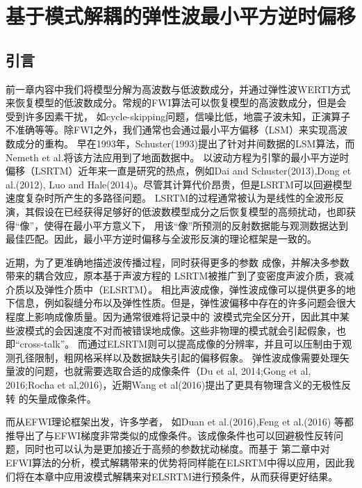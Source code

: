 \chapter{基于模式解耦的弹性波最小平方逆时偏移}
\label{cha:MD-ELSRTM}
\section{引言}
前一章内容中我们将模型分解为高波数与低波数成分，并通过弹性波WERTI方式来恢复模型的低波数成分。常规的FWI算法可以恢复模型的高波数成分，但是会受到许多因素干扰，
如cycle-skipping问题，信噪比低，地震子波未知，正演算子不准确等等。除FWI之外，我们通常也会通过最小平方偏移（LSM）来实现高波数成分的重构。
早在1993年，Schuster(1993)\cite{Schuster1993}提出了针对井间数据的LSM算法，而Nemeth et al.\cite{Nemeth1999}将该方法应用到了地面数据中。
以波动方程为引擎的最小平方逆时偏移（LSRTM）近年来一直是研究的热点，例如Dai and
Schuster(2013)\cite{Dai2013},Dong et al.(2012)\cite{Dong2012}, Luo and
Hale(2014)\cite{Luo2014}。尽管其计算代价昂贵，但是LSRTM可以回避模型速度复杂时所产生的多路径问题。
LSRTM的过程通常被认为是线性的全波形反演，其假设在已经获得足够好的低波数模型成分之后恢复模型的高频扰动，也即获得“像”，使得在最小平方意义下，
用该“像”所预测的反射数据能与观测数据达到最佳匹配。因此，最小平方逆时偏移与全波形反演的理论框架是一致的。

近期，为了更准确地描述波传播过程，同时获得更多的参数
成像，并解决多参数带来的耦合效应，原本基于声波方程的
LSRTM被推广到了变密度声波介质\cite{Yang2016}，衰减介质\cite{Dai2015}以及弹性介质中\cite{Duan2016,Feng2016,Xu2016}（ELSRTM）。
相比声波成像，弹性波成像可以提供更多的地下信息，例如裂缝分布以及弹性性质。但是，弹性波偏移中存在的许多问题会很大程度上影响成像质量。因为通常很难将记录中的
波模式完全区分开，因此其中某些波模式的会因速度不对而被错误地成像。这些非物理的模式就会引起假象，也即“cross-talk”。
而通过ELSRTM则可以提高成像的分辨率，并且可以压制由于观测孔径限制，粗网格采样以及数据缺失引起的偏移假象。
弹性波成像需要处理矢量波的问题，也就需要选取合适的成像条件（Du et al, 2014\cite{DuEtAl2014};Gong et
al, 2016\cite{GongEtAl2016};Rocha et al,2016\cite{RochaEtAl2016a})，近期Wang et
al(2016)\cite{WangEtAl2016}提出了更具有物理含义的无极性反转
的矢量成像条件。

而从EFWI理论框架出发，许多学者，
如Duan et al.(2016)\cite{Duan2016},Feng et
al.(2016)\cite{Feng2016}
等都推导出了与EFWI梯度非常类似的成像条件。该成像条件也可以回避极性反转问题，同时也可以认为是更加接近于高频的参数扰动梯度。而基于
第二章中对EFWI算法的分析，模式解耦带来的优势将同样能在ELSRTM中得以应用，因此我们将在本章中应用波模式解耦来对ELSRTM进行预条件，从而获得更好结果。
